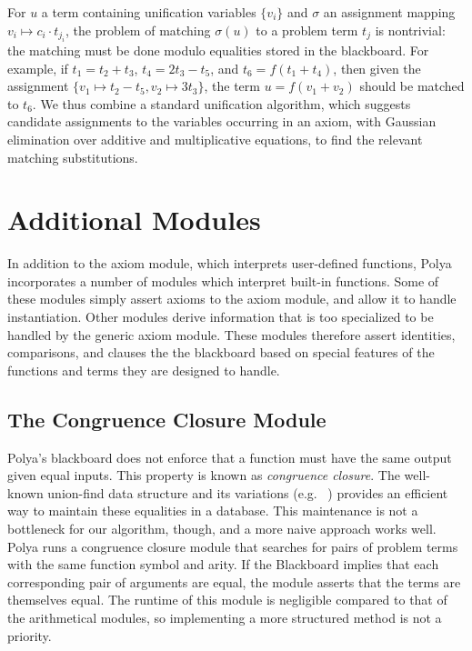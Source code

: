 \documentclass[runningheds]{llncs}
\begin{document}
For $u$ a term containing unification variables $\{v_i\}$ and $\sigma$ an assignment mapping $v_i\mapsto c_i\cdot t_{j_i}$, the problem of matching $\sigma(u)$ to a problem term $t_{j}$ is nontrivial: the matching must be done modulo equalities stored in the blackboard. For example, if $t_1 = t_2 + t_3$, $t_4 = 2 t_3 - t_5$, and $t_6 = f(t_1 + t_4)$, then given the assignment $\{ v_1 \mapsto t_2 - t_5, v_2 \mapsto 3 t_3 \}$, the term $u = f(v_1 + v_2)$ should be matched to $t_6$. We thus combine a standard unification algorithm, which suggests candidate assignments to the variables occurring in an axiom, with Gaussian elimination over additive and multiplicative equations, to find the relevant matching substitutions.


















\section{Additional Modules}
\label{section:other:modules}

In addition to the axiom module, which interprets user-defined functions, Polya incorporates a number of modules which interpret built-in functions. Some of these modules simply assert axioms to the axiom module, and allow it to handle instantiation. Other modules derive information that is too specialized to be handled by the generic axiom module. These modules therefore assert identities, comparisons, and clauses the the blackboard based on special features of the functions and terms they are designed to handle. 

\subsection{The Congruence Closure Module}
Polya's blackboard does not enforce that a function must have the same output given equal inputs. This property is known as \emph{congruence closure}. The well-known union-find data structure and its variations (e.g.\ \cite{demoura:bjorner:07} \cite{Moskal2008}) provides an efficient way to maintain these equalities in a database. This maintenance is not a bottleneck for our algorithm, though, and a more naive approach works well. Polya runs a congruence closure module that searches for pairs of problem terms with the same function symbol and arity. If the Blackboard implies that each corresponding pair of arguments are equal, the module asserts that the terms are themselves equal. The runtime of this module is negligible compared to that of the arithmetical modules, so implementing a more structured method is not a priority.
\end{document}
